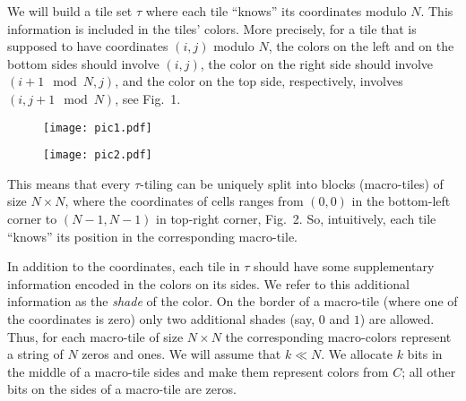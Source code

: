 \documentclass[runningheads]{llncs}
\begin{document}
We will build a tile set $\tau$ where each tile ``knows'' its coordinates modulo $N$. This information is included in the tiles' colors. More precisely, for a tile that is supposed to have  coordinates $(i,j)$ modulo $N$, the colors on the left and on the bottom sides should involve $(i,j)$, the color on the right side should involve $(i+1\mod N, j)$, and the color on the top side, respectively, involves $(i, j+1 \mod N)$, see Fig.~1. 
\begin{figure}
\center
\begin{minipage}[b]{0.45\linewidth}
\center
\texttt{[image: pic1.pdf]}
\label{pic1}
\caption{}
\end{minipage}
\begin{minipage}[b]{0.40\linewidth}
\center
\texttt{[image: pic2.pdf]}
\label{pic2}
\caption{}
\end{minipage}
\end{figure}
This means that every $\tau$-tiling can be uniquely split into blocks (macro-tiles) of size $N\times N$, where the coordinates of cells ranges from $(0,0)$ in the bottom-left corner to $(N-1,N-1)$ in top-right corner, Fig.~2. So,  intuitively, each tile ``knows'' its position in the corresponding macro-tile.


 In addition to the coordinates, each tile in $\tau$ should have some supplementary information   encoded in the colors on its sides. We refer to this additional information as the \emph{shade} of the color. On the border of a macro-tile (where one of the coordinates is zero) only two additional shades (say, $0$ and $1$) are allowed. Thus, for each macro-tile of size $N\times N$ the corresponding macro-colors represent a string of $N$ zeros and ones. We will assume that $k\ll N$.  We allocate  $k$ bits in the middle of a macro-tile sides and make them represent colors from $C$; all other bits on the sides of a macro-tile are zeros.
  
\end{document}

